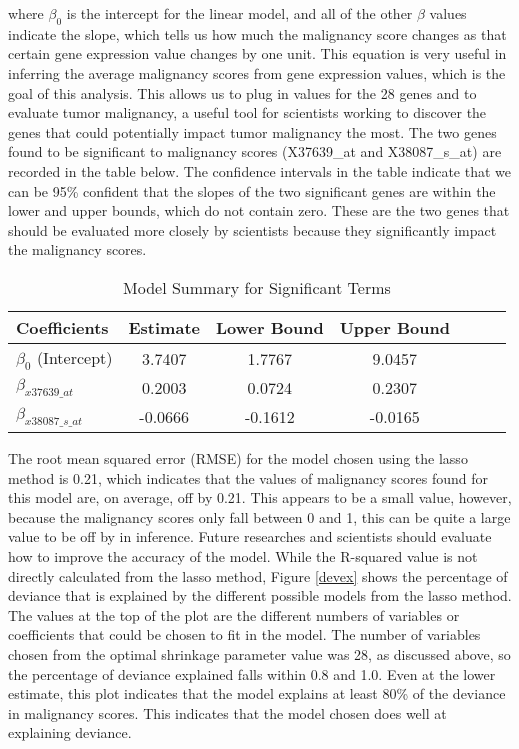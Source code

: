 \documentclass{svproc}
\begin{document}
where $\beta_0$ is the intercept for the linear model, and all of the other $\beta$ values indicate the slope, which tells us how much the malignancy score changes as that certain gene expression value changes by one unit. This equation is very useful in inferring the average malignancy scores from gene expression values, which is the goal of this analysis. This allows us to plug in values for the 28 genes and to evaluate tumor malignancy, a useful tool for scientists working to discover the genes that could potentially impact tumor malignancy the most. The two genes found to be significant to malignancy scores (X37639\_at and X38087\_s\_at) are recorded in the table below. The confidence intervals in the table indicate that we can be 95\% confident that the slopes of the two significant genes are within the lower and upper bounds, which do not contain zero. These are the two genes that should be evaluated more closely by scientists because they significantly impact the malignancy scores.

\begin{table}[H]
\begin{center}
\caption{Model Summary for Significant Terms}
\begin{tabular}{l | c c c c c l}
\hline
Coefficients & {Estimate   } & { Lower Bound  } & { Upper Bound  }  \\
\hline
$\beta_0$ (Intercept)  & 3.7407 & 1.7767 & 9.0457 \\
$\beta_{x37639\_at}$ & 0.2003 & 0.0724 & 0.2307 \\
$\beta_{x38087\_s\_at}$  & -0.0666 & -0.1612 & -0.0165 \\
\hline
\end{tabular}
\label{coef}
\end{center}
\end{table}

The root mean squared error (RMSE) for the model chosen using the lasso method is 0.21, which indicates that the values of malignancy scores found for this model are, on average, off by 0.21. This appears to be a small value, however, because the malignancy scores only fall between 0 and 1, this can be quite a large value to be off by in inference. Future researches and scientists should evaluate how to improve the accuracy of the model. While the R-squared value is not directly calculated from the lasso method, Figure \ref{devex} shows the percentage of deviance that is explained by the different possible models from the lasso method. The values at the top of the plot are the different numbers of variables or coefficients that could be chosen to fit in the model. The number of variables chosen from the optimal shrinkage parameter value was 28, as discussed above, so the percentage of deviance explained falls within 0.8 and 1.0. Even at the lower estimate, this plot indicates that the model explains at least 80\% of the deviance in malignancy scores. This indicates that the model chosen does well at explaining deviance.
\end{document}
